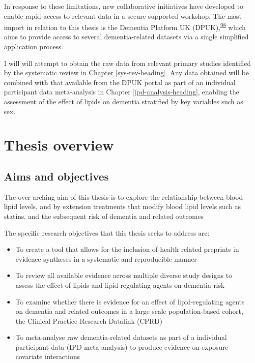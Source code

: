 \documentclass[a4paper, twoside]{templates/ociamthesis}
\providecommand{\tightlist}{%
  \setlength{\itemsep}{0pt}\setlength{\parskip}{0pt}}
\begin{document}
In response to these limitations, new collaborative initiatives have developed to enable rapid access to relevant data in a secure supported workshop. The most import in relation to this thesis is the Dementia Platform UK (DPUK),\textsuperscript{\protect\hyperlink{ref-bauermeister2020}{98}} which aims to provide access to several dementia-related datasets via a single simplified application process.

I will will attempt to obtain the raw data from relevant primary studies identified by the systematic review in Chapter \ref{sys-rev-heading}. Any data obtained will be combined with that available from the DPUK portal as part of an individual participant data meta-analysis in Chapter \ref{ipd-analysis-heading}, enabling the assessment of the effect of lipids on dementia stratified by key variables such as sex.

\hypertarget{thesis-overview}{%
\section{Thesis overview}\label{thesis-overview}}

\hypertarget{aims-and-objectives}{%
\subsection{Aims and objectives}\label{aims-and-objectives}}

The over-arching aim of this thesis is to explore the relationship between blood lipid levels, and by extension treatments that modify blood lipid levels such as statins, and the subsequent risk of dementia and related outcomes

The specific research objectives that this thesis seeks to address are:

\begin{itemize}
\tightlist
\item
  To create a tool that allows for the inclusion of health related preprints in evidence syntheses in a systematic and reproducible manner
\item
  To review all available evidence across multiple diverse study designs to assess the effect of lipids and lipid regulating agents on dementia risk
\item
  To examine whether there is evidence for an effect of lipid-regulating agents on dementia and related outcomes in a large scale population-based cohort, the Clinical Practice Research Datalink (CPRD)
\item
  To meta-analyse raw dementia-related datasets as part of a individual participant data (IPD meta-analysis) to produce evidence on exposure-covariate interactions
\end{itemize}
\end{document}
